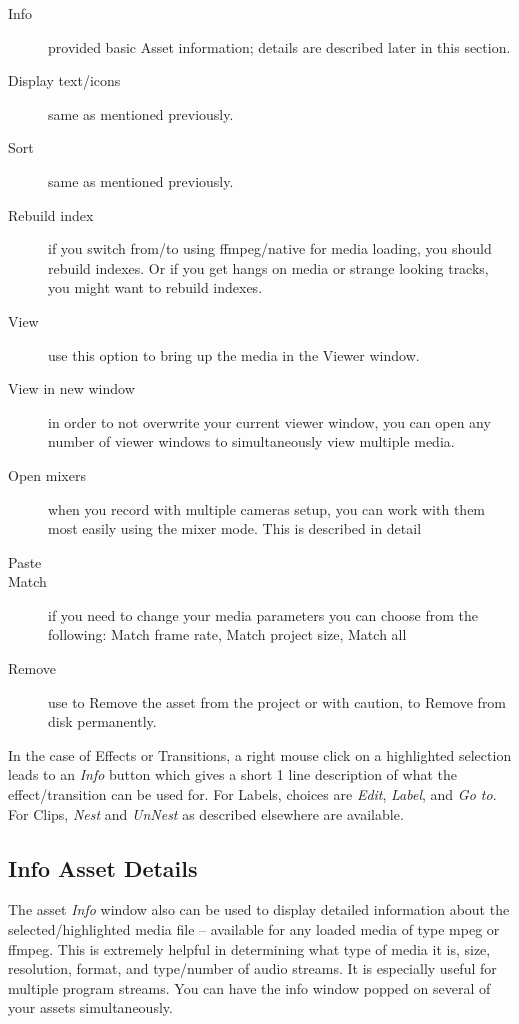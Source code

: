 \begin{description}
    \item[Info]  provided basic Asset information; details are described later in this section.
    \item[Display text/icons]  same as mentioned previously.
    \item[Sort]  same as mentioned previously.
    \item[Rebuild index] if you switch from/to using ffmpeg/native for media loading, you should rebuild
        indexes.  Or if you get hangs on media or strange looking tracks, you might want to rebuild indexes.
    \item[View]  use this option to bring up the media in the Viewer window.
    \item[View in new window]  in order to not overwrite your current viewer window, you can open any
        number of viewer windows to simultaneously view multiple media.
    \item[Open mixers]  when you record with multiple cameras setup, you can work with them most easily
        using the mixer mode.  This is described in detail
    \item[Paste]  
    \item[Match]  if you need to change your media parameters you can choose from the following: Match frame
        rate, Match project size, Match all 
    \item[Remove]  use to Remove the asset from the project or with caution, to Remove from disk permanently.
\end{description}

In the case of Effects or Transitions, a right mouse click on a highlighted selection leads to an \emph{Info} button which gives a short 1 line description of what the effect/transition can be used for.
For Labels, choices are \emph{Edit}, \emph{Label}, and \emph{Go to}.
For Clips, \emph{Nest} and \emph{UnNest} as described elsewhere are available.

\subsection{Info Asset Details}%
\label{sub:info_asset_details}

The asset \emph{Info} window also can be used to display detailed information about the selected/highlighted media file -- available for any loaded media of type mpeg or ffmpeg.  
This is extremely helpful in determining what type of media it is, size, resolution, format, and type/number of audio streams.  It is especially useful for multiple program streams.  You can have the info window popped on several of your assets simultaneously.

